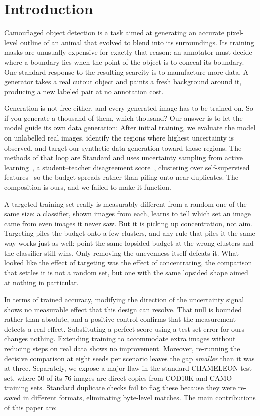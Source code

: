 \documentclass{article}
\begin{document}
\section{Introduction}
\label{sec:intro}
Camouflaged object detection is a task aimed at generating an accurate pixel-level outline of an animal that evolved to blend into its surroundings. Its training masks are unusually expensive for exactly that reason: an annotator must
decide where a boundary lies when the point of the object is to conceal its boundary. One standard response to the resulting scarcity is to manufacture more data. A generator takes a real
cutout object and paints a fresh background around it, producing a new labeled pair at no
annotation cost.


Generation is not free either, and every generated image has to be trained on. So if you generate
a thousand of them, which thousand? Our answer is to let the model guide its own data generation: After initial training, we evaluate the model on unlabelled real images, identify the regions where highest uncertainty is observed, and target our synthetic data generation toward those regions. The methods of that loop are
Standard and uses uncertainty sampling from active learning~\citep{settles2009active}, a student--teacher
disagreement score~\citep{tarvainen2017mean}, clustering over self-supervised
features~\citep{oquab2024dinov2} so the budget spreads rather than piling onto near-duplicates. The
composition is ours, and we failed to make it function.


A targeted training set really is measurably different from a random one of the same size: a classifier, shown images from each, learns to tell which set an image came from even images it never saw. But it is picking up concentration, not aim. Targeting piles the budget onto a few clusters, and any rule that piles it the same way works just as well: point the same lopsided budget at the wrong clusters and the classifier still wins. Only removing the unevenness itself defeats it. What looked like the effect of targeting was the effect of concentrating, the
comparison that settles it is not a random set, but one with the same lopsided shape
aimed at nothing in particular.


In terms of trained accuracy, modifying the direction of the uncertainty signal shows no measurable effect that this design can resolve. That null is
bounded rather than absolute, and a positive control confirms that the measurement detects a real effect.
Substituting a perfect score using a test-set error for ours changes nothing. Extending training to accommodate extra images without reducing steps on real data shows no improvement. Moreover, re-running the decisive comparison at eight
seeds per scenario leaves the gap \emph{smaller} than it was at three. Separately, we expose a major flaw in the standard CHAMELEON test set, where 50 of its 76 images are direct copies from COD10K and CAMO training sets. Standard duplicate checks fail to flag these because they were re-saved in different formats, eliminating byte-level matches. The main contributions of this paper are:
\end{document}
